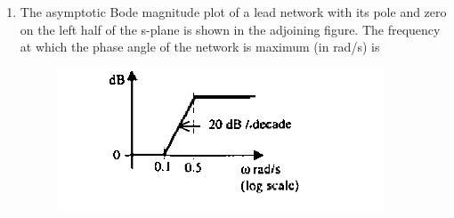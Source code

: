 \documentclass[journal,12pt,onecolumn]{IEEEtran}
\theoremstyle{remark}
\begin{document}
\begin{enumerate}
\vspace{0.5cm}

\item The asymptotic Bode magnitude plot of a lead network with its pole and zero on the left half of the s-plane is shown in the adjoining figure. The frequency at which the phase angle of the network is maximum (in rad/s) is
\begin{figure}[h]
    \centering
    \includegraphics[scale=0.75]{q37}
    \caption*{}
    \label{fig:placeholder}
\end{figure}
\hfill{}\begin{enumerate}  \end{enumerate}


\end{enumerate}
\end{document}
